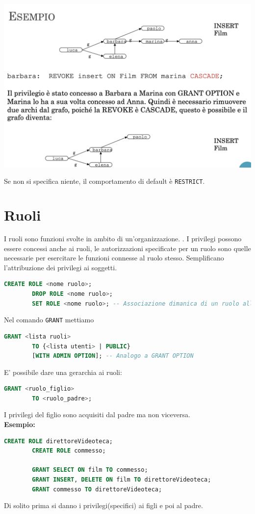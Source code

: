 \documentclass[12pt, a4paper]{report}
\begin{document}
    \begin{center}
        \includegraphics[scale=0.4]{Appunti Latex/Immagini/esempiorevokecascade.png}
    \end{center}
    Se non si specifica niente, il comportamento di default è \texttt{RESTRICT}.
    \section{Ruoli}
    I ruoli sono funzioni svolte in ambito di un'organizzazione. . I privilegi possono essere concessi anche ai ruoli, le autorizzazioni specificate per un ruolo sono quelle necessarie per esercitare le funzioni connesse al ruolo stesso. Semplificano l'attribuzione dei privilegi ai soggetti.
    \begin{lstlisting}[language=SQL]
        CREATE ROLE <nome ruolo>;
        DROP ROLE <nome ruolo>;
        SET ROLE <nome ruolo>; -- Associazione dimanica di un ruolo all'utente della sessione attiva
    \end{lstlisting}
    Nel comando \texttt{GRANT} mettiamo
    \begin{lstlisting}[language=SQL]
        GRANT <lista ruoli>
        TO {<lista utenti> | PUBLIC}
        [WITH ADMIN OPTION]; -- Analogo a GRANT OPTION
    \end{lstlisting}
    E' possibile dare una gerarchia ai ruoli:
    \begin{lstlisting}[language=SQL]
        GRANT <ruolo_figlio> 
        TO <ruolo_padre>;
    \end{lstlisting}
    I privilegi del figlio sono acquisiti dal padre ma non viceversa.
    \\\textbf{Esempio:}
    \begin{lstlisting}[language=SQL]
        CREATE ROLE direttoreVideoteca;
        CREATE ROLE commesso;

        GRANT SELECT ON film TO commesso;
        GRANT INSERT, DELETE ON film TO direttoreVideoteca;
        GRANT commesso TO direttoreVideoteca;
    \end{lstlisting}
    Di solito prima si danno i privilegi(specifici) ai figli e poi al padre.
\end{document}
